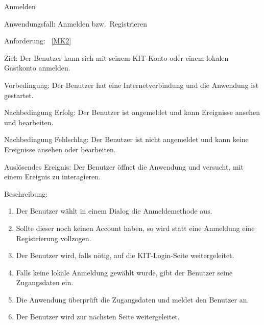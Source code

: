 \pagebreak

\begin{function}{20}{Anmelden}
    \item[Anwendungsfall:] Anmelden bzw.\ Registrieren
    \item[Anforderung:]~\ref{MK2}
    \item[Ziel:] Der Benutzer kann sich mit seinem KIT-Konto oder einem lokalen Gastkonto anmelden.
    \item[Vorbedingung:] Der Benutzer hat eine Internetverbindung und die Anwendung ist gestartet.
    \item[Nachbedingung Erfolg:] Der Benutzer ist angemeldet und kann Ereignisse ansehen und bearbeiten.
    \item[Nachbedingung Fehlschlag:] Der Benutzer ist nicht angemeldet und kann keine Ereignisse ansehen oder bearbeiten.
    \item[Auslösendes Ereignis:] Der Benutzer öffnet die Anwendung und versucht, mit einem Ereignis zu interagieren.
    \item[Beschreibung:] ~
    \begin{enumerate}
        \item Der Benutzer wählt in einem Dialog die Anmeldemethode aus.
        \item Sollte dieser noch keinen Account haben, so wird statt eine Anmeldung eine Registrierung vollzogen.
        \item Der Benutzer wird, falls nötig, auf die KIT-Login-Seite weitergeleitet.
        \item Falls keine lokale Anmeldung gewählt wurde, gibt der Benutzer seine Zugangsdaten ein.
        \item Die Anwendung überprüft die Zugangsdaten und meldet den Benutzer an.
        \item Der Benutzer wird zur nächsten Seite weitergeleitet.
    \end{enumerate}
\end{function}

\pagebreak

